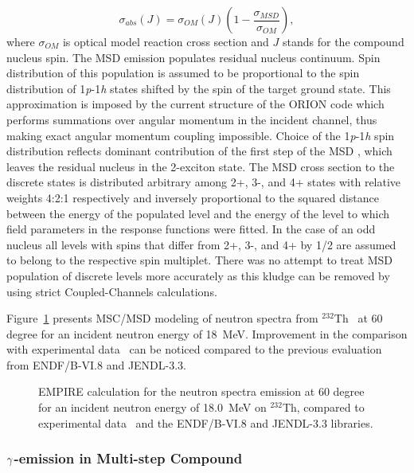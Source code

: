 \begin{equation}
\sigma_{abs}(J)=\sigma_{OM}(J)\left(1-%
\frac{\sigma_{MSD}}{\sigma_{OM}}\right),  \label{CNabs}
\end{equation}
\noindent where $\sigma_{OM}$ is optical model reaction cross section and $J$
stands for the compound nucleus spin. The MSD%
 emission populates residual nucleus continuum. Spin distribution
of this population is assumed to be proportional to the spin distribution of
1\emph{p}-1\emph{h} states shifted by the spin of the target ground state.
This approximation is imposed by the current structure of the ORION%
 code which performs summations over angular momentum in the
incident channel, thus making exact angular momentum coupling impossible.
Choice of the 1\emph{p}-1\emph{h} spin distribution reflects dominant
contribution of the first step of the MSD%
, which leaves the residual nucleus in the 2-exciton state. The
MSD%
 cross section to the discrete states is distributed arbitrary
among 2+, 3-, and 4+ states with relative weights 4:2:1 respectively and
inversely proportional to the squared distance between the energy of the
populated level and the energy of the level to which field parameters in the
response functions were fitted. In the case of an odd nucleus all levels
with spins that differ from 2+, 3-, and 4+ by 1/2 are assumed to belong to
the respective spin multiplet. There was no attempt to treat MSD%
 population of discrete levels more accurately as this kludge can
be removed by using strict Coupled-Channels calculations.

Figure~\ref{thoriumMSD} presents MSC/MSD modeling of neutron spectra from $%
^{232}$Th~\cite{crp} at 60 degree for an incident neutron energy of 18~MeV.
Improvement in the comparison with experimental data~\cite{mats} can be
noticed compared to the previous evaluation from ENDF/B-VI.8 and JENDL-3.3.
\begin{figure}[htbp]
\caption{EMPIRE calculation for the neutron spectra emission at 60 degree
for an incident neutron energy of 18.0~MeV on $^{232}$Th, compared to
experimental data~\protect\cite{mats} and the ENDF/B-VI.8 and JENDL-3.3
libraries.}
\label{thoriumMSD}
\end{figure}

\subsubsection{$\protect\gamma$-emission in Multi-step Compound}

